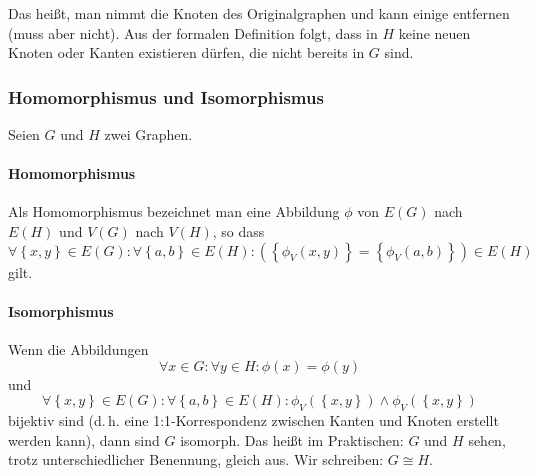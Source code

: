 \documentclass{scrartcl}
\begin{document}
Das heißt, man nimmt die Knoten des Originalgraphen und kann einige entfernen (muss aber nicht). Aus der formalen Definition folgt,
dass in $H$ keine neuen Knoten oder Kanten existieren dürfen, die nicht bereits in $G$ sind.

\subsubsection{Homomorphismus und Isomorphismus}

Seien $G$ und $H$ zwei Graphen.

\paragraph{Homomorphismus} Als Homomorphismus bezeichnet man eine Abbildung $\phi$ von
$E(G)$ nach $E(H)$ und $V(G)$ nach $V(H)$, so dass 
\begin{equation}
	\forall \left\{x, y\right\} \in E(G): \forall \left\{a, b\right\} \in E(H): \left(\left\{\phi_V(x, y)\right\} = \left\{\phi_V(a, b)\right\}\right) \in E(H)
\end{equation}
gilt.

\paragraph{Isomorphismus} Wenn die Abbildungen 
\begin{equation}
	\forall x \in G: \forall y \in H: \phi(x) = \phi(y)
\end{equation}
und 
\begin{equation}
	\forall \left\{x, y\right\} \in E(G): \forall \left\{a, b\right\} \in E(H): \phi_V\left(\left\{x, y\right\}\right) \wedge \phi_V\left(\left\{x, y\right\}\right)
\end{equation}
bijektiv sind (d.\,h. eine 1:1-Korrespondenz zwischen Kanten
und Knoten erstellt werden kann), dann sind $G$ isomorph. Das heißt im Praktischen: $G$ und $H$ sehen, trotz unterschiedlicher Benennung,
\frq gleich aus\flq. Wir schreiben: $G \cong H$.
\end{document}
